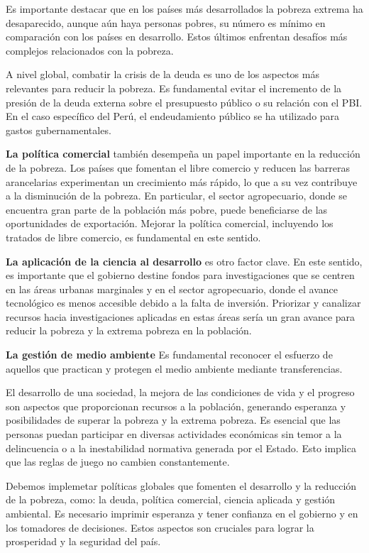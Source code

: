 \documentclass[
  a4paper,
]{article}
\begin{document}
Es importante destacar que en los países más desarrollados la pobreza
extrema ha desaparecido, aunque aún haya personas pobres, su número es
mínimo en comparación con los países en desarrollo. Estos últimos
enfrentan desafíos más complejos relacionados con la pobreza.

A nivel global, combatir la crisis de la deuda es uno de los aspectos
más relevantes para reducir la pobreza. Es fundamental evitar el
incremento de la presión de la deuda externa sobre el presupuesto
público o su relación con el PBI. En el caso específico del Perú, el
endeudamiento público se ha utilizado para gastos gubernamentales.

\textbf{La política comercial} también desempeña un papel importante en
la reducción de la pobreza. Los países que fomentan el libre comercio y
reducen las barreras arancelarias experimentan un crecimiento más
rápido, lo que a su vez contribuye a la disminución de la pobreza. En
particular, el sector agropecuario, donde se encuentra gran parte de la
población más pobre, puede beneficiarse de las oportunidades de
exportación. Mejorar la política comercial, incluyendo los tratados de
libre comercio, es fundamental en este sentido.

\textbf{La aplicación de la ciencia al desarrollo} es otro factor clave.
En este sentido, es importante que el gobierno destine fondos para
investigaciones que se centren en las áreas urbanas marginales y en el
sector agropecuario, donde el avance tecnológico es menos accesible
debido a la falta de inversión. Priorizar y canalizar recursos hacia
investigaciones aplicadas en estas áreas sería un gran avance para
reducir la pobreza y la extrema pobreza en la población.

\textbf{La gestión de medio ambiente} Es fundamental reconocer el
esfuerzo de aquellos que practican y protegen el medio ambiente mediante
transferencias.

El desarrollo de una sociedad, la mejora de las condiciones de vida y el
progreso son aspectos que proporcionan recursos a la población,
generando esperanza y posibilidades de superar la pobreza y la extrema
pobreza. Es esencial que las personas puedan participar en diversas
actividades económicas sin temor a la delincuencia o a la inestabilidad
normativa generada por el Estado. Esto implica que las reglas de juego
no cambien constantemente.

Debemos implemetar políticas globales que fomenten el desarrollo y la
reducción de la pobreza, como: la deuda, política comercial, ciencia
aplicada y gestión ambiental. Es necesario imprimir esperanza y tener
confianza en el gobierno y en los tomadores de decisiones. Estos
aspectos son cruciales para lograr la prosperidad y la seguridad del
país.
\end{document}

